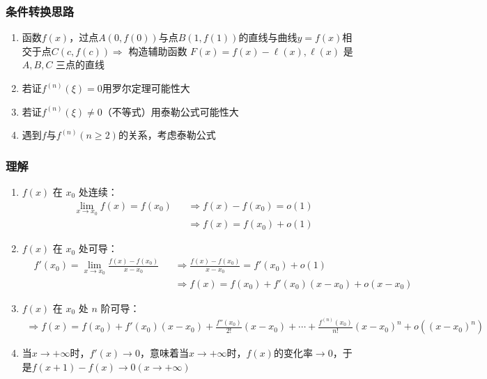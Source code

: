 \documentclass[../book.tex]{subfiles}
\begin{document}
    \subsubsection{条件转换思路}

    \begin{enumerate}
        \item 函数$f(x)$，过点$A(0, f(0))$与点$B(1, f(1))$的直线与曲线$y = f(x)$相交于点$C(c, f(c)) \Rightarrow$ 构造辅助函数 $F(x) = f(x) - \ell(x), \ell(x)$ 是$A, B, C$ 三点的直线
        \item 若证$f^{(n)}(\xi) = 0$用罗尔定理可能性大
        \item 若证$f^{(n)}(\xi) \neq 0$（不等式）用泰勒公式可能性大
        \item 遇到$f$与$f^{(n)}(n \geq 2)$的关系，考虑泰勒公式
    \end{enumerate}

    \subsubsection{理解}

    \begin{enumerate}
        \item $f(x)$ 在 $x_0$ 处连续：
        \[
            \begin{aligned}
                &\lim_{x \to x_0} f(x) = f(x_0)
                &&\Rightarrow f(x) - f(x_0) = o(1) \\
                &&&\Rightarrow f(x) = f(x_0) + o(1)
            \end{aligned}
        \]

        \item $f(x)$ 在 $x_0$ 处可导：
        \[
            \begin{aligned}
                &f'(x_0)
                = \lim_{x \to x_0} \frac{f(x)-f(x_0)}{x-x_0}
                &&\Rightarrow
                \frac{f(x)-f(x_0)}{x-x_0}
                = f'(x_0) + o(1) \\
                &&&\Rightarrow
                f(x) = f(x_0) + f'(x_0)(x-x_0) + o(x-x_0)
            \end{aligned}
        \]

        \item $f(x)$ 在 $x_0$ 处 $n$ 阶可导：
        \[
            \begin{aligned}
                \Rightarrow
                f(x)
                = f(x_0) + f'(x_0)(x - x_0) + \displaystyle\frac{f''(x_0)}{2!}(x - x_0) + \cdots + \displaystyle\frac{f^{(n)}(x_0)}{n!}(x - x_0)^{n} + o((x - x_0)^n)
            \end{aligned}
        \]
        \item 当$x \to +\infty$时，$f'(x) \to 0$，意味着当$x \to +\infty$时，$f(x)$的变化率$\to 0$，于是$f(x+1) - f(x) \to 0(x\to +\infty)$
    \end{enumerate}
\end{document}
